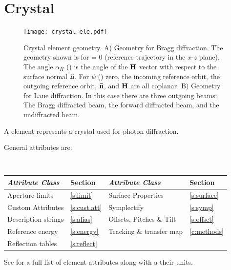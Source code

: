 \section{Crystal}
\label{s:crystal}

\begin{figure}[tb]
  \centering
  \texttt{[image: crystal-ele.pdf]}
  \caption[Crystal element geometry.]
{Crystal element geometry.  A) Geometry for Bragg diffraction. The geometry shown is for
 = 0 (reference trajectory in the $x$-$z$ plane). The angle $\alpha_H$
() is the angle of the ${\bf H}$ vector with respect to the surface normal ${\widehat{\bf n}}$. For $\psi$ () zero, the incoming reference orbit, the outgoing reference orbit,
${\widehat{\bf n}}$, and ${\bf H}$ are all coplanar. B) Geometry for Laue diffraction. In this case there are
three outgoing beams: The Bragg diffracted beam, the forward diffracted beam, and the undiffracted
beam.}
  \label{f:crystal}
\end{figure}

A  element represents a crystal used for photon diffraction.

General  attributes are:
\begin{center}
\tt
\begin{tabular}{llll} \toprule
  {\sl Attribute Class}      & Section          & {\sl Attribute Class}      & Section         \\ \midrule
  Aperture limits            & \ref{s:limit}    & Surface Properties         & \ref{s:surface} \\ 
  Custom Attributes          & \ref{s:cust.att} & Symplectify                & \ref{s:symp}    \\
  Description strings        & \ref{s:alias}    & Offsets, Pitches \& Tilt   & \ref{s:offset}  \\
  Reference energy           & \ref{s:energy}   & Tracking \& transfer map   & \ref{c:methods} \\
  Reflection tables          & \ref{s:reflect}  &                            &                 \\
  \bottomrule
\end{tabular}
\end{center}
\toffset
See  for a full list of element attributes along with a their units.

